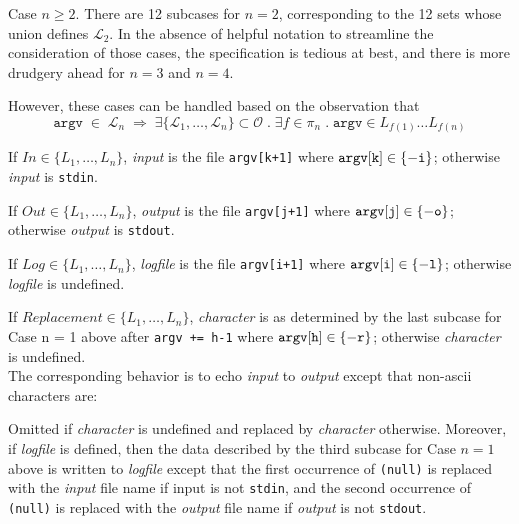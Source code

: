 \documentclass[12pt]{article}
\newcommand{\es}[1] {\begin{equation*}#1\end{equation*}}
\newcommand{\LRa}{\Longrightarrow}
\begin{document}
Case $n \geq 2$. 
There are 12 subcases for $n = 2$, corresponding to the 12 sets whose union defines $\mathcal{L}_2$. 
In the absence of helpful notation to streamline the consideration of those cases,
the specification is tedious at best, and there is more drudgery ahead for $n = 3$ and $n = 4$.

However, these cases can be handled based on the observation that
\es{
    \texttt{argv} \;\in\; \mathcal{L}_n \;\LRa\; \exists \{\mathcal{L}_1, \dots, \mathcal{L}_n\} 
    \subset \mathcal{O} \;.\; \exists f \in \pi_n \;.\; \texttt{argv} \in L_{f(1)} \dotsc L_{f(n)}
}

If $In \in \{L_1, \dots, L_n\}$, \textit{input} is the file \texttt{argv[k+1]} where $\tt{argv[k]} \in \{-i\}$; 
    otherwise \textit{input} is \texttt{stdin}.

If $Out \in \{L_1, \dots, L_n\}$, \textit{output} is the file \texttt{argv[j+1]} where $\tt{argv[j]} \in \{-o\}$; 
    otherwise \textit{output} is \texttt{stdout}.

If $Log \in \{L_1, \dots, L_n\}$, \textit{logfile} is the file \texttt{argv[i+1]} where $\tt{argv[i]} \in \{-l\}$;
    otherwise \textit{logfile} is undefined. 

If $Replacement \in \{L_1, \dots, L_n\}$, \textit{character} is as determined by the last subcase for 
    Case n = 1 above after \texttt{argv += h-1} where $\tt{argv[h]} \in \{-r\}$;
    otherwise \textit{character} is undefined. \\

The corresponding behavior is to echo \textit{input} to \textit{output} except that non-ascii characters are:

Omitted if \textit{character} is undefined and replaced by \textit{character} otherwise. 
Moreover, if \textit{logfile} is defined, then the data described by the third subcase for Case $n = 1$ above is written to
\textit{logfile} except that the first occurrence of \texttt{(null)} is replaced with the \textit{input} file name if input
is not \texttt{stdin}, and the second occurrence of \texttt{(null)} is replaced with the \textit{output} file name if
\textit{output} is not \texttt{stdout}.
\end{document}
